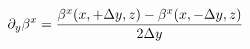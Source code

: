 \documentclass[preview]{standalone}
\begin{document}
\begin{align*}
\special{dvisvgm:raw <g id='unique000'>}\partial_y\beta^x = \frac{\beta^x(x,+\Delta y,z)-\beta^x(x,-\Delta y,z)}{2\Delta y}\special{dvisvgm:raw </g>}
\end{align*}
\end{document}
